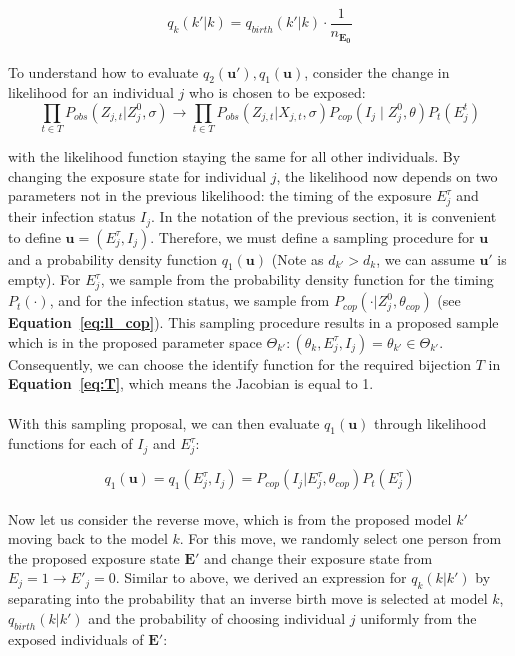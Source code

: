 \begin{equation}
q_k(k' | k) = q_{birth}(k' |k)\cdot \frac{1}{n_{\mathbf{E_0}}}
\end{equation}

\paragraph{}To understand how to evaluate $q_2(\mathbf{u}'), q_1(\mathbf{u})$, consider the change in likelihood for an individual $j$ who is chosen to be exposed:
\begin{equation}
\prod_{t \in T}P_{obs}(Z_{j,t}|Z^0_{j}, \sigma)  \rightarrow  \prod_{t \in T}P_{obs}(Z_{j,t}|X_{j,t}, \sigma)P_{cop}(I_j \mid Z^0_{j}, \theta)P_t(E_j^t)
\end{equation}

with the likelihood function staying the same for all other individuals. By changing the exposure state for individual $j$, the likelihood now depends on two parameters not in the previous likelihood: the timing of the exposure $E^\tau_j$ and their infection status $I_j$. In the notation of the previous section, it is convenient to define $\mathbf{u} = (E^\tau_j, I_j)$. Therefore, we must define a sampling procedure for $\mathbf{u}$ and a probability density function $q_1(\mathbf{u})$ (Note as $d_{k'} > d_k$, we can assume $\mathbf{u'}$ is empty).  For $E^\tau_j$, we sample from the probability density function for the timing $P_t(\cdot)$, and for the infection status, we sample from $P_{cop}(\cdot | Z_j^0, \theta_{cop})$ (see \textbf{Equation~\ref{eq:ll_cop}}). This sampling procedure results in a proposed sample which is in the proposed parameter space $\Theta_{k'}: (\theta_k, E^\tau_j, I_j) = \theta_{k'} \in \Theta_{k'}$. Consequently, we can choose the identify function for the required bijection $T$ in \textbf{Equation~\ref{eq:T}}, which means the Jacobian is equal to 1.

\paragraph{}With this sampling proposal, we can then evaluate $q_1(\mathbf{u})$ through likelihood functions for each of $I_j$ and $E^\tau_j$:

\begin{equation}
q_1(\mathbf{u}) = q_1(E^\tau_j, I_j) = P_{cop}(I_j | E_j^\tau, \theta_{cop})P_t(E^\tau_j)
\end{equation}

\paragraph{}Now let us consider the reverse move, which is from the proposed model $k'$ moving back to the model $k$. For this move, we randomly select one person from the proposed exposure state $\mathbf{E'}$ and change their exposure state from $E_j = 1 \rightarrow E'_j = 0$. Similar to above, we derived an expression for $q_k(k | k')$ by separating into the probability that an inverse birth move is selected at model $k$, $q_{birth}(k |k')$ and the probability of choosing individual $j$ uniformly from the exposed individuals of $\mathbf{E}'$:

